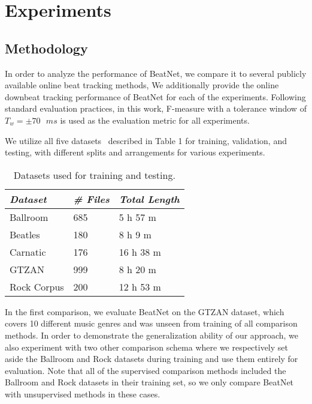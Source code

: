 \documentclass{article}
\begin{document}
\section{Experiments}
\subsection{Methodology}
In order to analyze the performance of BeatNet, we compare it to several publicly available online beat tracking methods, We additionally provide the online downbeat tracking performance of BeatNet for each of the experiments. Following standard evaluation practices, in this work, F-measure with a tolerance window of $T_{w}=\pm70\text{ }ms$ is used as the evaluation metric for all experiments.


We utilize all five datasets~\cite{Gouyon:2,Krebs:4,davis,Srinivasamurthy,Marchand,Tzanetakis,Clercq} described in Table 1 for training, validation, and testing, with different splits and arrangements for various experiments.
\begin{table}[t]
  \begin{center}
    \begin{tabular}{L{0.30\columnwidth}C{0.20\columnwidth}C{0.25\columnwidth}}
        \hline
        \textit{Dataset} & \textit{\# Files} & \textit{Total Length} \\
        \hline
        \small Ballroom \cite{Gouyon:2,Krebs:4} & \small 685 & \small 5 h 57 m \\
        \hline
        \small Beatles \cite{davis} & \small 180 & \small 8 h 9 m \\
        \hline
        \small Carnatic \cite{Srinivasamurthy} & \small 176 & \small 16 h 38 m \\
        \hline
        \small GTZAN \cite{Marchand,Tzanetakis} & \small 999 & \small 8 h 20 m \\
        \hline
        \small Rock Corpus \cite{Clercq} & \small 200 & \small 12 h 53 m \\
        \hline
    \end{tabular}
    \caption{Datasets used for training and testing.}
    \label{tab:results}
  \end{center}
\end{table}
In the first comparison, we evaluate BeatNet on the GTZAN dataset, which covers 10 different music genres and was unseen from training of all comparison methods.  In order to demonstrate the generalization ability of our approach, we also experiment with two other comparison schema where we respectively set aside the Ballroom and Rock datasets during training and use them entirely for evaluation. Note that all of the supervised comparison methods included the Ballroom and Rock datasets in their training set, so we only compare BeatNet with unsupervised methods in these cases.
\end{document}
